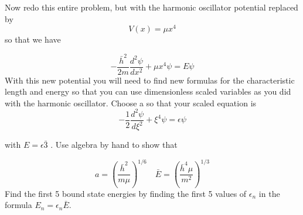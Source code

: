 \begin{problem} \label{P4.5}
	\begin{enumerate}[label=(\alph*)]
Now redo this entire problem, but with the harmonic oscillator potential
replaced by
\begin{equation}\label{eq:418}
V(x)=\mu x^4
\end{equation}
so that we have

\begin{equation}\label{eq:419}
-\frac{\bar{h}^{2}}{2 m} \frac{d^{2} \psi}{d x^{2}}+\mu x^{4} \psi=E \psi
\end{equation}
With this new potential you will need to find new formulas for the characteristic length and energy so that you can use dimensionless scaled variables as
you did with the harmonic oscillator. Choose a so that your scaled equation
is
\begin{equation}\label{eq:420}
- \frac{1}{2} \frac{d^{2} \psi}{d \xi^{2}} + \xi^{4} \psi = \epsilon \psi
\end{equation}

with $E = \epsilon \bar{3}$ . Use algebra by hand to show that

\begin{equation}\label{eq:421}
a=\left(\frac{\bar{h}^{2}}{m \mu}\right)^{1 / 6} \quad \bar{E}=\left(\frac{\bar{h}^{4} \mu}{m^{2}}\right)^{1 / 3}
\end{equation}
Find the first 5 bound state energies by finding the first 5 values of $ \epsilon_n $ in the
formula $E_n =  \epsilon_n \bar{E}$.

\end{enumerate}
\end{problem}